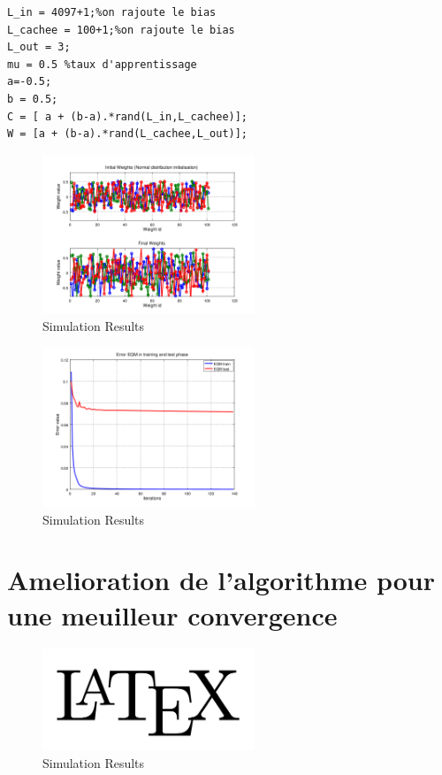 \documentclass[journal]{IEEEtran}
\begin{document}
\begin{lstlisting}
L_in = 4097+1;%on rajoute le bias
L_cachee = 100+1;%on rajoute le bias
L_out = 3;
mu = 0.5 %taux d'apprentissage
a=-0.5;
b = 0.5;
C = [ a + (b-a).*rand(L_in,L_cachee)];
W = [a + (b-a).*rand(L_cachee,L_out)];
\end{lstlisting}



\blindtext
\begin{figure}[h]
	\centering
	\includegraphics[width=2.5in]{../OctaveNeurons/rs2}
	\caption{Simulation Results}
	\label{fig_sim}
\end{figure}
\blindtext
\begin{figure}[h]
	\centering
	\includegraphics[width=2.5in]{../OctaveNeurons/rs1}
	\caption{Simulation Results}
	\label{fig_sim}
\end{figure}
\blindtext

\section{Amelioration de l'algorithme pour une meuilleur convergence}\blindtext
\blindtext
\begin{figure}[h]
	\centering
	\includegraphics[width=2.5in]{logo}
	\caption{Simulation Results}
	\label{fig_sim}
\end{figure}
\end{document}
